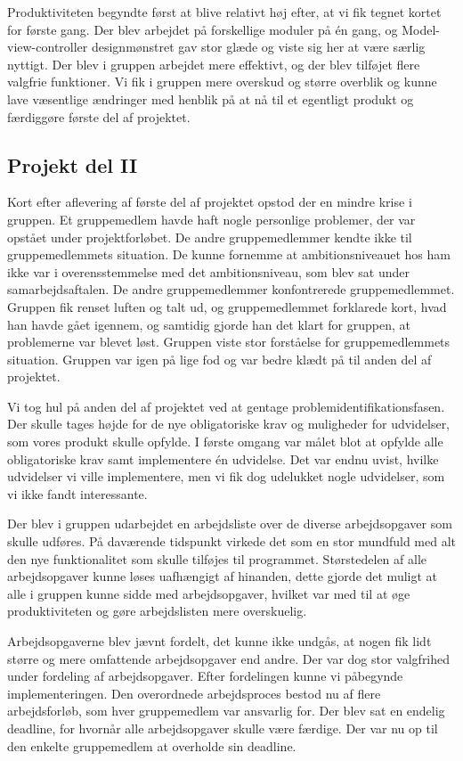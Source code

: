 Produktiviteten begyndte først at blive relativt høj efter, at vi fik tegnet kortet for første gang. Der blev arbejdet på forskellige moduler på én gang, og Model-view-controller designmønstret gav stor glæde og viste sig her at være særlig nyttigt. Der blev i gruppen arbejdet mere effektivt, og der blev tilføjet flere valgfrie funktioner. Vi fik i gruppen mere overskud og større overblik og kunne lave væsentlige ændringer med henblik på at nå til et egentligt produkt og færdiggøre første del af projektet. 

\subsection{Projekt del II}

Kort efter aflevering af første del af projektet opstod der en mindre krise i gruppen. Et gruppemedlem havde haft nogle personlige problemer, der var opstået under projektforløbet. De andre gruppemedlemmer kendte ikke til gruppemedlemmets situation. De kunne fornemme at ambitionsniveauet hos ham ikke var i overensstemmelse med det ambitionsniveau, som blev sat under samarbejdsaftalen. De andre gruppemedlemmer konfontrerede gruppemedlemmet. Gruppen fik renset luften og talt ud, og gruppemedlemmet forklarede kort, hvad han havde gået igennem, og samtidig gjorde han det klart for gruppen, at problemerne var blevet løst. Gruppen viste stor forståelse for gruppemedlemmets situation. Gruppen var igen på lige fod og var bedre klædt på til anden del af projektet. 

Vi tog hul på anden del af projektet ved at gentage problemidentifikationsfasen. Der skulle tages højde for de nye obligatoriske krav og muligheder for udvidelser, som vores produkt skulle opfylde. I første omgang var målet blot at opfylde alle obligatoriske krav samt implementere én udvidelse. Det var endnu uvist, hvilke udvidelser vi ville implementere, men vi fik dog udelukket nogle udvidelser, som vi ikke fandt interessante.

Der blev i gruppen udarbejdet en arbejdsliste over de diverse arbejdsopgaver som skulle udføres. På daværende tidspunkt virkede det som en stor mundfuld med alt den nye funktionalitet som skulle tilføjes til programmet. Størstedelen af alle arbejdsopgaver kunne løses uafhængigt af hinanden, dette gjorde det muligt at alle i gruppen kunne sidde med arbejdsopgaver, hvilket var med til at øge produktiviteten og gøre arbejdslisten mere overskuelig.

Arbejdsopgaverne blev jævnt fordelt, det kunne ikke undgås, at nogen fik lidt større og mere omfattende arbejdsopgaver end andre. Der var dog stor valgfrihed under fordeling af arbejdsopgaver. Efter fordelingen kunne vi påbegynde implementeringen. Den overordnede arbejdsproces bestod nu af flere arbejdsforløb, som hver gruppemedlem var ansvarlig for. Der blev sat en endelig deadline, for hvornår alle arbejdsopgaver skulle være færdige. Der var nu op til den enkelte gruppemedlem at overholde sin deadline.

